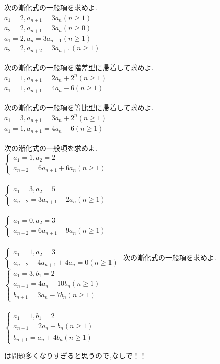 \documentclass[10pt,fleqn,a4paper]{jsarticle}
\newcommand{\ans}[1]{\mbox{\boldmath{$#1$}}}
\begin{document}
\newpage
\noindent{}次の漸化式の一般項を求めよ.\\
\kakkoichi $a_1=2,a_{n+1}=3a_n　(n\geq1)$\\
\kakkoni $a_2=2,a_{n+1}=3a_n　(n\geq0)$\\
\kakkosan $a_1=2,a_n=3a_{n-1}　(n\geq1)$\\
\kakkoshi $a_2=2,a_{n+2}=3a_{n+1}　(n\geq1)$\\\\
次の漸化式の一般項を階差型に帰着して求めよ.\\
\kakkoichi $a_1=1,a_{n+1}=2a_n+2^n　(n\geq1)$\\
\kakkoni $a_1=1,a_{n+1}=4a_n-6　(n\geq1)$\\\\
次の漸化式の一般項を等比型に帰着して求めよ.\\
\kakkoichi$a_1=3,a_{n+1}=3a_n+2^n　(n\geq1)$\\
\kakkoni$a_1=1,a_{n+1}=4a_n-6　(n\geq1)$\\\\
次の漸化式の一般項を求めよ.\\
\kakkoichi$\begin{cases}
    a_1=1,a_2=2\\
    a_{n+2}=6a_{n+1}+6a_n　(n\geq1)
\end{cases}$\\\\
\kakkoni$\begin{cases}
    a_1=3,a_2=5\\
    a_{n+2}=3a_{n+1}-2a_n　(n\geq1)
\end{cases}$\\\\
\kakkosan$\begin{cases}
    a_1=0,a_2=3\\
    a_{n+2}=6a_{n+1}-9a_n　(n\geq1)
\end{cases}$\\\\
\kakkoshi$\begin{cases}
    a_1=1,a_2=3\\
    a_{n+2}-4a_{n+1}+4a_n=0　(n\geq1)
\end{cases}$
\newpage
\noindent{}次の漸化式の一般項を求めよ.\\
\kakkoichi$\begin{cases}
    a_1=3,b_1=2\\
    a_{n+1}=4a_n-10b_n　(n\geq1)\\
    b_{n+1}=3a_n-7b_n　(n\geq1)
\end{cases}$\\\\
\kakkoni$\begin{cases}
    a_1=1,b_1=2\\
    a_{n+1}=2a_n-b_n　(n\geq1)\\
    b_{n+1}=a_n+4b_n　(n\geq1)
\end{cases}$
\newpage
\begin{center}
    \ans{3章の問題演習}は問題多くなりすぎると思うので,なしで！！
\end{center}
\newpage
\end{document}
